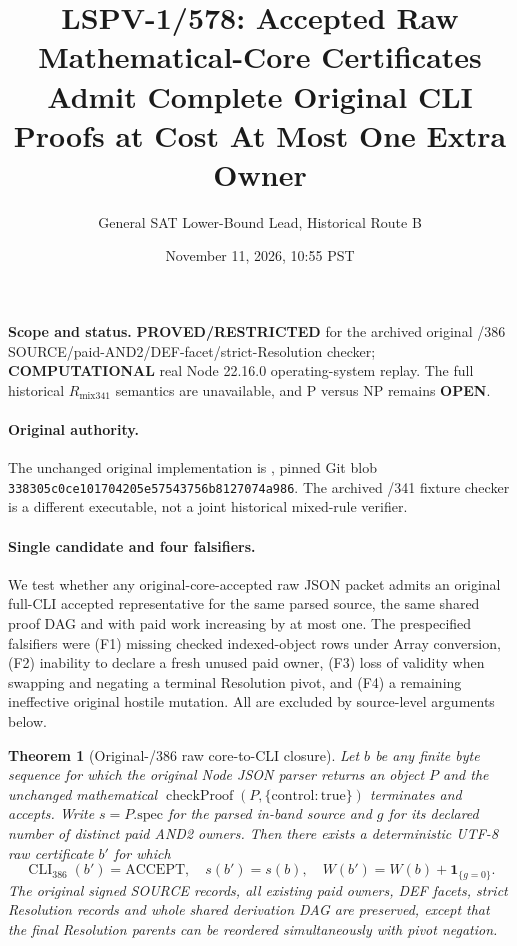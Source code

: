 \documentclass[11pt]{article}
\title{LSPV-1/578: Accepted Raw Mathematical-Core Certificates\\
Admit Complete Original CLI Proofs at Cost At Most One Extra Owner}
\author{General SAT Lower-Bound Lead, Historical Route B}
\date{November 11, 2026, 10:55 PST}
\newtheorem{theorem}{Theorem}
\begin{document}
\maketitle
\noindent\textbf{Scope and status.}
\textbf{PROVED/RESTRICTED} for the archived original /386 SOURCE/paid-AND2/DEF-facet/strict-Resolution checker;
\textbf{COMPUTATIONAL} real Node 22.16.0 operating-system replay.
The full historical $R_{\mathrm{mix341}}$ semantics are unavailable,
and P versus NP remains \textbf{OPEN}.

\paragraph{Original authority.}
The unchanged original implementation is
,
pinned Git blob \texttt{338305c0ce101704205e57543756b8127074a986}.
The archived /341 fixture checker is a different executable,
not a joint historical mixed-rule verifier.

\paragraph{Single candidate and four falsifiers.}
We test whether any original-core-accepted raw JSON packet admits an
original full-CLI accepted representative for the same parsed source,
the same shared proof DAG and with paid work increasing by at most one.
The prespecified falsifiers were (F1) missing checked indexed-object
rows under Array conversion, (F2) inability to declare a fresh
unused paid owner, (F3) loss of validity when swapping and negating
a terminal Resolution pivot, and (F4) a remaining ineffective original
hostile mutation. All are excluded by source-level arguments below.

\begin{theorem}[Original-/386 raw core-to-CLI closure]
Let $b$ be any finite byte sequence for which the original Node JSON
parser returns an object $P$ and the unchanged mathematical
$\operatorname{checkProof}(P,\{\mathrm{control:true}\})$ terminates and
accepts. Write $s=P.\mathrm{spec}$ for the parsed in-band source and
$g$ for its declared number of distinct paid AND2 owners.
Then there exists a deterministic UTF-8 raw certificate $b'$ for which
\[
\operatorname{CLI}_{386}(b')=\mathrm{ACCEPT},
\quad s(b')=s(b),
\quad W(b')=W(b)+\mathbf{1}_{\{g=0\}}.
\]
The original signed SOURCE records, all existing paid owners,
DEF facets, strict Resolution records and whole shared derivation
DAG are preserved, except that the final Resolution parents can be
reordered simultaneously with pivot negation.
\end{theorem}
\end{document}
